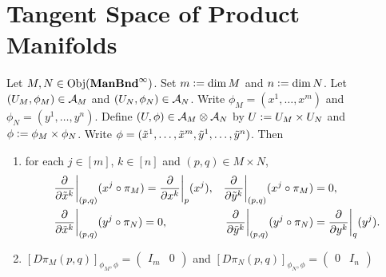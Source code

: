 \documentclass{book}
\begin{document}
	
	
	
	
	
	
	
	
	
	
	
	
	\section{Tangent Space of Product Manifolds}
	
	\begin{ex} 
		Let $M,N \in \operatorname{Obj}(\operatorname*{\text{\textbf{ManBnd}}^{\infty}})$. Set $m \vcentcolon= \dim M$ and $n \vcentcolon= \dim N$. Let $(U_M, \phi_M) \in \mathcal{A}_M$ and $(U_N, \phi_N) \in \mathcal{A}_N$. Write $\phi_M = (x^1, \ldots, x^m)$ and $\phi_N = (y^1, \ldots, y^n)$. Define $(U, \phi) \in \mathcal{A}_M \otimes \mathcal{A}_N$ by $U \vcentcolon= U_M \times U_N$ and $\phi \vcentcolon= \phi_M \times \phi_N$. Write $\phi = (\tilde{x}^1, \ldots, \tilde{x}^m, \tilde{y}^1, \ldots, \tilde{y}^n)$. Then 
		\begin{enumerate}
			\item for each $j \in [m]$, $k \in [n]$ and $(p,q) \in M \times N$,
			\begin{align*}
				& \frac{\partial }{\partial \tilde{x}^k} \bigg|_{(p,q)} ( x^j \circ \pi_M ) = \frac{\partial}{\partial x^k} \bigg|_p (x^j), 
				& \frac{\partial }{\partial \tilde{y}^k} \bigg|_{(p,q)} ( x^j \circ \pi_M ) & = 0, \\
				& \frac{\partial }{\partial \tilde{x}^k} \bigg|_{(p,q)} ( y^j \circ \pi_N ) = 0, 
				& \frac{\partial }{\partial \tilde{y}^k} \bigg|_{(p,q)} ( y^j \circ \pi_N ) & =  \frac{\partial}{\partial y^k} \bigg|_q (y^j).
			\end{align*}
			\item $[D \pi_M (p,q)]_{\phi_M, \phi} = 
			\begin{pmatrix}
				I_m & 0
			\end{pmatrix}$
			and 
			$[D \pi_N (p,q)]_{\phi_N, \phi} = 
			\begin{pmatrix}
				0 & I_n
			\end{pmatrix}$
		\end{enumerate}
	\end{ex}
	
\end{document}
